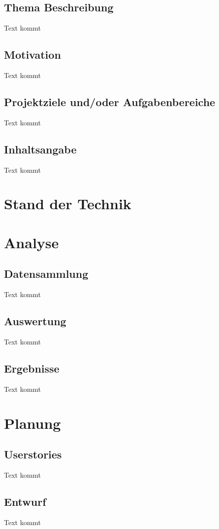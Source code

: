 \documentclass{wissdoc}
\begin{document}
\section{Thema Beschreibung}
Text kommt

\section{Motivation}
Text kommt

\section{Projektziele und/oder Aufgabenbereiche}
Text kommt

\section{Inhaltsangabe}
Text kommt


\chapter{Stand der Technik}

\chapter{Analyse}

\section{Datensammlung}
Text kommt

\section{Auswertung}
Text kommt

\section{Ergebnisse}
Text kommt


\chapter{Planung}

\section{Userstories}
Text kommt

\section{Entwurf}
Text kommt
\end{document}
